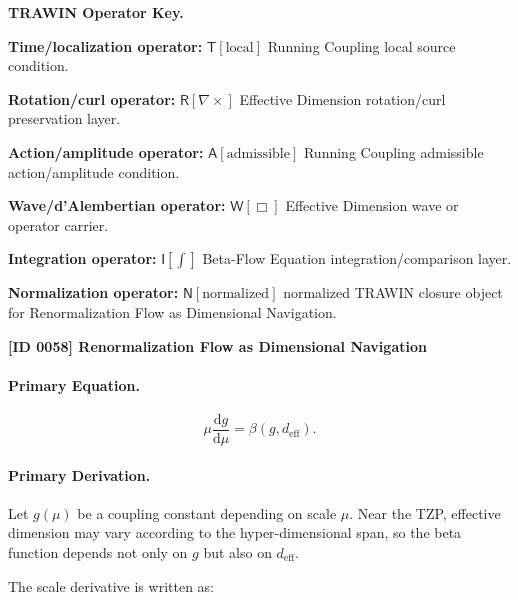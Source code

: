 \par\vspace{0.45\baselineskip}
\noindent\begin{minipage}[t]{\linewidth}
\begingroup
\small
\raggedright
\textbf{TRAWIN Operator Key.}\par
\noindent\textbf{Time/localization operator:} $\mathsf{T}\!\left[\mathrm{local}\right]$ Running Coupling local source condition.\par
\noindent\textbf{Rotation/curl operator:} $\mathsf{R}\!\left[\nabla\times\right]$ Effective Dimension rotation/curl preservation layer.\par
\noindent\textbf{Action/amplitude operator:} $\mathsf{A}\!\left[\mathrm{admissible}\right]$ Running Coupling admissible action/amplitude condition.\par
\noindent\textbf{Wave/d'Alembertian operator:} $\mathsf{W}\!\left[\Box\right]$ Effective Dimension wave or operator carrier.\par
\noindent\textbf{Integration operator:} $\mathsf{I}\!\left[\int\right]$ Beta-Flow Equation integration/comparison layer.\par
\noindent\textbf{Normalization operator:} $\mathsf{N}\!\left[\mathrm{normalized}\right]$ normalized TRAWIN closure object for Renormalization Flow as Dimensional Navigation.\par
\endgroup
\end{minipage}

\clearpage
\noindent\textbf{[ID 0058] Renormalization Flow as Dimensional Navigation}\par
\vspace{0.35em}
\paragraph{Primary Equation.}
\begin{equation}
\mu\frac{\mathrm{d}g}{\mathrm{d}\mu}
=
\beta(g,d_{\mathrm{eff}}).
\end{equation}

\paragraph{Primary Derivation.}
Let $g(\mu)$ be a coupling constant depending on scale $\mu$.  
Near the TZP, effective dimension may vary according to the hyper-dimensional span, so the beta function depends not only on $g$ but also on $d_{\mathrm{eff}}$.

The scale derivative is written as:

